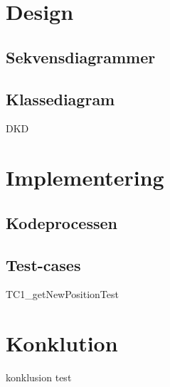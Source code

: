 \documentclass{article}
\begin{document}
{\newpage
\section{Design}

\subsection{Sekvensdiagrammer}

\newpage
\subsection{Klassediagram}
{DKD}

\section{Implementering}
\subsection{Kodeprocessen}

\subsection{Test-cases}
{TC1_getNewPositionTest}



\section{Konklution}
{konklusion}
test
\newpage
\cleardoublepage
\printbibliography[heading=bibintoc]
}
\end{document}
